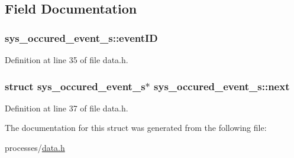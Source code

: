 \subsection{Field Documentation}
\hypertarget{structsys__occured__event__s_a2bc2b2ee398582222728db5ad4aea1de}{}
\subsubsection[{event\+I\+D}]{ sys\+\_\+occured\+\_\+event\+\_\+s\+::event\+I\+D}\label{structsys__occured__event__s_a2bc2b2ee398582222728db5ad4aea1de}


Definition at line 35 of file data.\+h.

\hypertarget{structsys__occured__event__s_a5279262bb3a0710e84ecf6199dbca28e}{}
\subsubsection[{next}]{\setlength{\rightskip}{0pt plus 5cm}struct {\bf sys\+\_\+occured\+\_\+event\+\_\+s}$\ast$ sys\+\_\+occured\+\_\+event\+\_\+s\+::next}\label{structsys__occured__event__s_a5279262bb3a0710e84ecf6199dbca28e}


Definition at line 37 of file data.\+h.



The documentation for this struct was generated from the following file\+:\begin{DoxyCompactItemize}
\item 
processes/\hyperlink{data_8h}{data.\+h}\end{DoxyCompactItemize}
